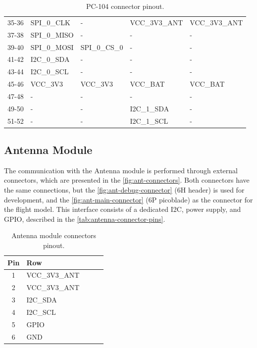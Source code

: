 \begin{table}[!h]
\begin{tabular}{cllll}
        35-36              & SPI\_0\_CLK      & -                & VCC\_3V3\_ANT & VCC\_3V3\_ANT \\
        37-38              & SPI\_0\_MISO     & -                & -             & -             \\
        39-40              & SPI\_0\_MOSI     & SPI\_0\_CS\_0    & -             & -             \\
        41-42              & I2C\_0\_SDA      & -                & -             & -             \\
        43-44              & I2C\_0\_SCL      & -                & -             & -             \\
        45-46              & VCC\_3V3         & VCC\_3V3         & VCC\_BAT      & VCC\_BAT      \\
        47-48              & -                & -                & -             & -             \\
        49-50              & -                & -                & I2C\_1\_SDA   & -             \\
        51-52              & -                & -                & I2C\_1\_SCL   & -             \\
        \bottomrule[1.5pt]
    \end{tabular}
    \caption{PC-104 connector pinout.}
    \label{tab:pc104-pins}
\end{table}

\subsection{Antenna Module}

The communication with the Antenna module is performed through external connectors, which are presented in the \autoref{fig:ant-connectors}. Both connectors have the same connections, but the \ref{fig:ant-debug-connector} (6H header) is used for development, and the \ref{fig:ant-main-connector} (6P picoblade) as the connector for the flight model. This interface consists of a dedicated I2C, power supply, and GPIO, described in the \autoref{tab:antenna-connector-pins}.

\begin{table}[!ht]
    \centering
    \begin{tabular}{cllll}
        \toprule[1.5pt]
        \textbf{Pin} & \textbf{Row} \\
        \midrule
        1            & VCC\_3V3\_ANT  \\
        2            & VCC\_3V3\_ANT  \\
        3            & I2C\_SDA       \\
        4            & I2C\_SCL       \\
        5            & GPIO           \\
        6            & GND            \\
        \bottomrule[1.5pt]
    \end{tabular}
    \caption{Antenna module connectors pinout.}
    \label{tab:antenna-connector-pins}
\end{table}

